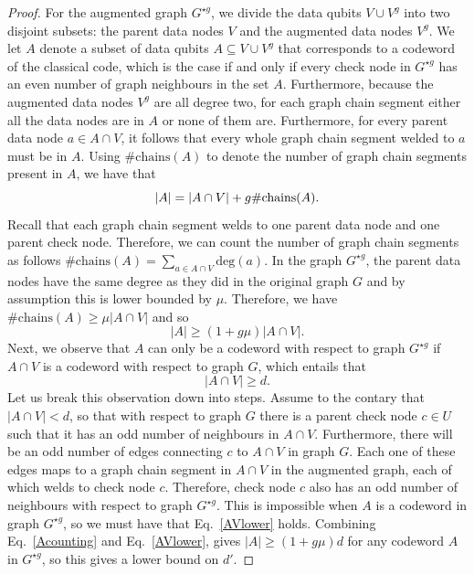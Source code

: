 \documentclass[%
 reprint,
superscriptaddress,
nofootinbib,
 amsmath,amssymb,
secnumarabic
]{revtex4-1}
\begin{document}
\begin{proof}  	For the augmented graph $G^{\star g}$, we divide the data qubits $V \cup V^{g}$ into two disjoint subsets: the parent data nodes $V$ and the augmented data nodes $V^{g}$. We let $A$ denote a subset of data qubits $A \subseteq V \cup V^{g}$ that corresponds to a codeword of the classical code, which is the case if and only if every check node in $G^{\star g}$ has an even number of graph neighbours in the set $A$.	 Furthermore, because the augmented data nodes $V^{g}$ are all degree two, for each graph chain segment either all the data nodes are in $A$ or none of them are.  Furthermore, for every parent data node $a \in A \cap V$, it follows that every whole graph chain segment welded to $a$ must be in $A$.  Using  $\#\mathrm{chains}(A)$ to denote the number of graph chain segments present in $A$, we have that
\begin{equation}
	|A| =  | A \cap V  |  + g  \#\mathrm{chains}(A)\rm.
\end{equation}		
Recall that each graph chain segment welds to one parent data node and one parent check node.  Therefore, we can count the number of graph chain segments as follows $\#\mathrm{chains}(A)= \sum_{a \in A \cap V} \mathrm{deg}(a)$.  In the graph $G^{\star g}$, the parent data nodes have the same degree as they did in the original graph $G$ and by assumption this is lower bounded by $\mu$.  Therefore, we have $\#\mathrm{chains}(A) \geq \mu |A \cap V|   $ and so
\begin{equation}
	\label{Acounting}
	|A| \geq (1+ g \mu) | A \cap V  |.
\end{equation}	
Next, we observe that $A$ can only be a codeword with respect to graph $G^{\star g}$ if $A \cap V$ is a codeword with respect to graph $G$, which entails that 
\begin{equation} 
	\label{AVlower}
	| A \cap V  | \geq d. 
\end{equation}
Let us break this observation down into steps.  Assume to the contary that 	$| A \cap V  | < d$, so that with respect to graph $G$ there is a parent check node $c \in U$ such that it has an odd number of neighbours in $A \cap V$.  Furthermore, there will be an odd number of edges connecting $c$ to $A \cap V$ in graph $G$.   Each one of these edges maps to a graph chain segment in $A \cap V$ in the augmented graph, each of which welds to check node $c$.  Therefore, check node $c$ also has an odd number of neighbours with respect to graph $G^{\star g}$.  This is impossible when $A$ is a codeword in graph $G^{\star g}$, so we must have that Eq.~\eqref{AVlower} holds. Combining Eq.~\eqref{Acounting} and Eq.~\eqref{AVlower}, gives $|A| \geq (1+ g \mu) d$ for any codeword $A$ in $G^{\star g}$, so this gives a lower bound on $d'$.


\end{proof}
\end{document}
